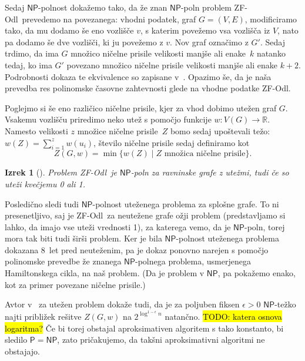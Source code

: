 \documentclass[12pt,a4paper,twoside]{article}
\theoremstyle{definition} %
\theoremstyle{plain} %
\newtheorem{izrek}[definicija]{Izrek}
\numberwithin{equation}{section}  %
\newcommand{\R}{\mathbb R}
\renewcommand{\P}{\ensuremath{\mathsf{P}}}
\newcommand{\NP}{\ensuremath{\mathsf{NP}}}
\newcommand{\ZFOdl}{\textsf{ZF-Odl}}
\begin{document}
Sedaj $\NP$-polnost dokažemo tako, da že znan $\NP$-poln problem \ZFOdl\ prevedemo na povezanega: vhodni podatek, graf $G = (V,E)$, modificiramo tako, da mu dodamo še eno vozlišče $v$, s katerim povežemo vsa vozlišča iz $V$, nato pa dodamo še dve vozlišči, ki ju povežemo z $v$. Nov graf označimo z $G'$. Sedaj trdimo, da ima $G$ množico ničelne prisile velikosti manjše ali enake~$k$ natanko tedaj, ko ima $G'$ povezano množico ničelne prisile velikosti manjše ali enake $k + 2$. Podrobnosti dokaza te ekvivalence so zapisane v~\cite{brimkov2017complexity}. Opazimo še, da je naša prevedba res polinomske časovne zahtevnosti glede na vhodne podatke \ZFOdl.

Poglejmo si še eno različico ničelne prisile, kjer za vhod dobimo utežen graf $G$.
Vsakemu vozlišču priredimo neko utež s pomočjo funkcije $w\colon V(G) \rightarrow \R$. Namesto velikosti $z$ množice ničelne prisile~$Z$ bomo sedaj upoštevali težo: $w(Z) = \sum_{i=1}^{z} w(u_i)$, število ničelne prisile sedaj definiramo kot
\[ Z(G, w) = \min\{ w(Z) \mid Z \text{ množica ničelne prisile} \} .\]

\begin{izrek}[\cite{aazami2008hardness}]
    Problem \ZFOdl\ je $\NP$-poln za ravninske grafe z utežmi, tudi če so uteži kvečjemu 0 ali 1.
\end{izrek}
Posledično sledi tudi $\NP$-polnost uteženega problema za splošne grafe. To ni presenetljivo, saj je \ZFOdl\ za neutežene grafe ožji problem (predstavljamo si lahko, da imajo vse uteži vrednosti 1), za katerega vemo, da je $\NP$-poln, torej mora tak biti tudi širši problem. Ker je bila $\NP$-polnost uteženega problema dokazana 8~let pred neuteženim, pa je dokaz ponovno narejen s pomočjo polinomske prevedbe že znanega $\NP$-polnega problema, usmerjenega Hamiltonskega cikla, na naš problem. (Da je problem v $\NP$, pa pokažemo enako, kot za primer povezane ničelne prisile.)

Avtor v~\cite[izrek~2.3.8]{aazami2008hardness} za utežen problem dokaže tudi, da je za poljuben fiksen $\epsilon > 0$ $\NP$-težko najti približek rešitve $Z(G,w)$ na $2^{\log^{1-\epsilon}n}$ natančno. \hl{TODO: katera osnova logaritma?} Če bi torej obstajal aproksimativen algoritem s tako konstanto, bi sledilo $\P = \NP$, zato pričakujemo, da takšni aproksimativni algoritmi ne obstajajo.

\end{document}
